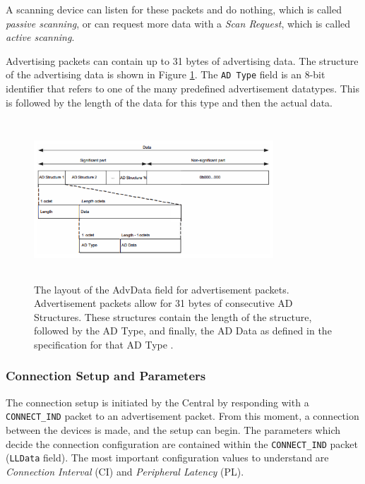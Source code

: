 A scanning device can listen for these packets and do nothing, which is called \textit{passive scanning}, or can request more data with a \textit{Scan Request}, which is called \textit{active scanning}. 

Advertising packets can contain up to 31 bytes of advertising data. The structure of the advertising data is shown in Figure \ref{fig:advdata_layout}. The \texttt{AD Type} field is an 8-bit identifier that refers to one of the many predefined advertisement datatypes. This is followed by the length of the data for this type and then the actual data. 

\begin{figure}[]
    \centering
    \includegraphics[width=0.8\textwidth,height=6cm,keepaspectratio=true]{images/advertising_data}
    \caption{
        The layout of the AdvData field for advertisement packets. Advertisement packets allow for 31 bytes of consecutive AD Structures. These structures contain the length of the structure, followed by the AD Type, and finally, the AD Data as defined in the specification for that AD Type \cite{bluetooth_spec}.
    }
    \label{fig:advdata_layout}
\end{figure}

\subsubsection{Connection Setup and Parameters}
The connection setup is initiated by the Central by responding with a \texttt{CONNECT\_IND} packet to an advertisement packet. From this moment, a connection between the devices is made, and the setup can begin. The parameters which decide the connection configuration are contained within the \texttt{CONNECT\_IND} packet (\texttt{LLData} field). The most important configuration values to understand are \textit{Connection Interval} (CI) and \textit{Peripheral Latency} (PL). 

